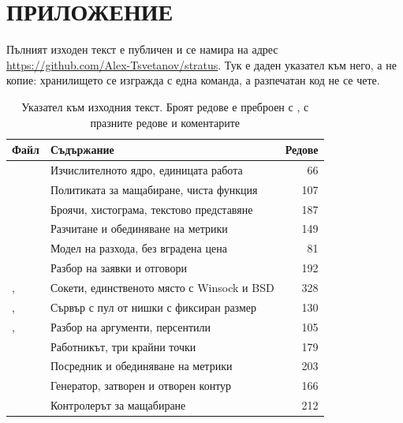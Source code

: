 \section*{ПРИЛОЖЕНИЕ}
\label{sec:appendix}

Пълният изходен текст е публичен и се намира на адрес
\url{https://github.com/Alex-Tsvetanov/stratus}. Тук е даден указател към него, а не копие:
хранилището се изгражда с една команда, а разпечатан код не се чете.

\begin{table}[H]
\caption{Указател към изходния текст. Броят редове е преброен с , с празните редове и коментарите}
\label{tab:sources}
\centering
\small
\begin{tabular}{@{}L{6.2cm}L{6.4cm}r@{}}
\toprule
\textbf{Файл} & \textbf{Съдържание} & \textbf{Редове} \\
\midrule
{} & Изчислителното ядро, единицата работа & 66 \\
 & Политиката за мащабиране, чиста функция & 107 \\
 & Броячи, хистограма, текстово представяне & 187 \\
 & Разчитане и обединяване на метрики & 149 \\
 & Модел на разхода, без вградена цена & 81 \\
 & Разбор на заявки и отговори & 192 \\
,  & Сокети, единственото място с Winsock и BSD & 328 \\
,  & Сървър с пул от нишки с фиксиран размер & 130 \\
,  & Разбор на аргументи, персентили & 105 \\
 & Работникът, три крайни точки & 179 \\
 & Посредник и обединяване на метрики & 203 \\
 & Генератор, затворен и отворен контур & 166 \\
 & Контролерът за мащабиране & 212 \\

\end{tabular}
\end{table}
